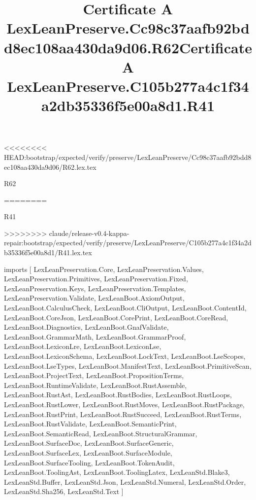 <<<<<<<< HEAD:bootstrap/expected/verify/preserve/LexLeanPreserve/Cc98c37aafb92bdd8ec108aa430da9d06/R62.lex.tex
\begin{lexlean}{R62}
\title{Certificate A LexLeanPreserve.Cc98c37aafb92bdd8ec108aa430da9d06.R62}
========
\begin{lexlean}{R41}
\title{Certificate A LexLeanPreserve.C105b277a4c1f34a2db35336f5e00a8d1.R41}
>>>>>>>> claude/release-v0.4-kappa-repair:bootstrap/expected/verify/preserve/LexLeanPreserve/C105b277a4c1f34a2db35336f5e00a8d1/R41.lex.tex
\begin{coremodule}
imports [
  LexLeanPreservation.Core,
  LexLeanPreservation.Values,
  LexLeanPreservation.Primitives,
  LexLeanPreservation.Fixed,
  LexLeanPreservation.Keys,
  LexLeanPreservation.Templates,
  LexLeanPreservation.Validate,
  LexLeanBoot.AxiomOutput,
  LexLeanBoot.CalculusCheck,
  LexLeanBoot.CliOutput,
  LexLeanBoot.ContentId,
  LexLeanBoot.CoreJson,
  LexLeanBoot.CorePrint,
  LexLeanBoot.CoreRead,
  LexLeanBoot.Diagnostics,
  LexLeanBoot.GnafValidate,
  LexLeanBoot.GrammarMath,
  LexLeanBoot.GrammarProof,
  LexLeanBoot.LexiconLre,
  LexLeanBoot.LexiconLse,
  LexLeanBoot.LexiconSchema,
  LexLeanBoot.LockText,
  LexLeanBoot.LseScopes,
  LexLeanBoot.LseTypes,
  LexLeanBoot.ManifestText,
  LexLeanBoot.PrimitiveScan,
  LexLeanBoot.ProjectText,
  LexLeanBoot.PropositionTerms,
  LexLeanBoot.RuntimeValidate,
  LexLeanBoot.RustAssemble,
  LexLeanBoot.RustAst,
  LexLeanBoot.RustBodies,
  LexLeanBoot.RustLoops,
  LexLeanBoot.RustLower,
  LexLeanBoot.RustMoves,
  LexLeanBoot.RustPackage,
  LexLeanBoot.RustPrint,
  LexLeanBoot.RustSucceed,
  LexLeanBoot.RustTerms,
  LexLeanBoot.RustValidate,
  LexLeanBoot.SemanticPrint,
  LexLeanBoot.SemanticRead,
  LexLeanBoot.StructuralGrammar,
  LexLeanBoot.SurfaceDoc,
  LexLeanBoot.SurfaceGeneric,
  LexLeanBoot.SurfaceLex,
  LexLeanBoot.SurfaceModule,
  LexLeanBoot.SurfaceTooling,
  LexLeanBoot.TokenAudit,
  LexLeanBoot.ToolingAst,
  LexLeanBoot.ToolingLatex,
  LexLeanStd.Blake3,
  LexLeanStd.Buffer,
  LexLeanStd.Json,
  LexLeanStd.Numeral,
  LexLeanStd.Order,
  LexLeanStd.Sha256,
  LexLeanStd.Text
]


\end{coremodule}
\end{lexlean}
\end{lexlean}
